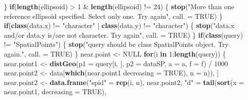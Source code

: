 \documentclass[11pt,a4paper]{article}
\newenvironment{Shaded}{}{}
\newcommand{\KeywordTok}[1]{\textcolor[rgb]{0.00,0.44,0.13}{\textbf{#1}}}
\newcommand{\DataTypeTok}[1]{\textcolor[rgb]{0.56,0.13,0.00}{#1}}
\newcommand{\DecValTok}[1]{\textcolor[rgb]{0.25,0.63,0.44}{#1}}
\newcommand{\StringTok}[1]{\textcolor[rgb]{0.25,0.44,0.63}{#1}}
\newcommand{\OtherTok}[1]{\textcolor[rgb]{0.00,0.44,0.13}{#1}}
\newcommand{\ControlFlowTok}[1]{\textcolor[rgb]{0.00,0.44,0.13}{\textbf{#1}}}
\newcommand{\OperatorTok}[1]{\textcolor[rgb]{0.40,0.40,0.40}{#1}}
\newcommand{\NormalTok}[1]{#1}
\begin{document}
\begin{Shaded}
\begin{Highlighting}[]
\NormalTok{  \}}
  \ControlFlowTok{if}\NormalTok{(}\KeywordTok{length}\NormalTok{(ellipsoid) }\OperatorTok{>}\StringTok{ }\DecValTok{1} \OperatorTok{&}\StringTok{ }\KeywordTok{length}\NormalTok{(ellipsoid) }\OperatorTok{!=}\StringTok{ }\DecValTok{24}\NormalTok{) \{}
    \KeywordTok{stop}\NormalTok{(}\StringTok{"More than one reference ellipsoid specified. }
\StringTok{         Select only one. Try again"}\NormalTok{, }\DataTypeTok{call. =} \OtherTok{TRUE}\NormalTok{)}
\NormalTok{  \}}
  \ControlFlowTok{if}\NormalTok{(}\KeywordTok{class}\NormalTok{(data.x) }\OperatorTok{!=}\StringTok{ "character"} \OperatorTok{|}\StringTok{ }\KeywordTok{class}\NormalTok{(data.y) }\OperatorTok{!=}\StringTok{ "character"}\NormalTok{) \{}
    \KeywordTok{stop}\NormalTok{(}\StringTok{"data.x and/or data.y is/are not character. }
\StringTok{         Try again"}\NormalTok{, }\DataTypeTok{call. =} \OtherTok{TRUE}\NormalTok{)}
\NormalTok{  \}}
  \ControlFlowTok{if}\NormalTok{(}\KeywordTok{class}\NormalTok{(query) }\OperatorTok{!=}\StringTok{ "SpatialPoints"}\NormalTok{) \{}
    \KeywordTok{stop}\NormalTok{(}\StringTok{"query should be class SpatialPoints object. }
\StringTok{         Try again."}\NormalTok{, }\DataTypeTok{call. =} \OtherTok{TRUE}\NormalTok{)}
\NormalTok{  \}}
\NormalTok{  near.point <-}\StringTok{ }\OtherTok{NULL}
  \ControlFlowTok{for}\NormalTok{(i }\ControlFlowTok{in} \DecValTok{1}\OperatorTok{:}\KeywordTok{length}\NormalTok{(query)) \{}
\NormalTok{      near.point1 <-}\StringTok{ }\KeywordTok{distGeo}\NormalTok{(}\DataTypeTok{p1 =}\NormalTok{ query[i, ], }\DataTypeTok{p2 =}\NormalTok{ dataSP, }\DataTypeTok{a =}\NormalTok{ a, }\DataTypeTok{f =}\NormalTok{ f) }\OperatorTok{/}\StringTok{ }\DecValTok{1000}
\NormalTok{      near.point2 <-}\StringTok{ }\NormalTok{data[}\KeywordTok{which}\NormalTok{(near.point1 }\OperatorTok{%
                                                           \DataTypeTok{decreasing =} \OtherTok{TRUE}\NormalTok{), }
                                                      \DataTypeTok{n =}\NormalTok{ n)), ]}
\NormalTok{      near.point2 <-}\StringTok{ }\KeywordTok{data.frame}\NormalTok{(}\StringTok{"spid"}\NormalTok{ =}\StringTok{ }\KeywordTok{rep}\NormalTok{(i, n), }
\NormalTok{                                near.point2,}
                                \StringTok{"d"}\NormalTok{ =}\StringTok{ }\KeywordTok{tail}\NormalTok{(}\KeywordTok{sort}\NormalTok{(}\DataTypeTok{x =}\NormalTok{ near.point1, }
                                                \DataTypeTok{decreasing =} \OtherTok{TRUE}\NormalTok{), }
}
\end{Highlighting}
\end{Shaded}
\end{document}
